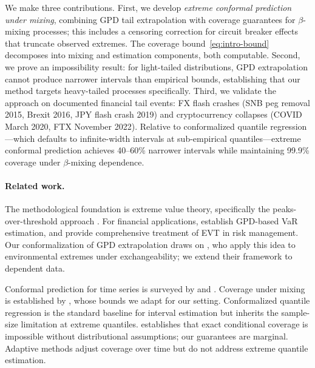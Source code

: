 We make three contributions. First, we develop \emph{extreme conformal prediction under mixing}, combining GPD tail extrapolation with coverage guarantees for $\beta$-mixing processes; this includes a censoring correction for circuit breaker effects that truncate observed extremes. The coverage bound~\eqref{eq:intro-bound} decomposes into mixing and estimation components, both computable. Second, we prove an impossibility result: for light-tailed distributions, GPD extrapolation cannot produce narrower intervals than empirical bounds, establishing that our method targets heavy-tailed processes specifically. Third, we validate the approach on documented financial tail events: FX flash crashes (SNB peg removal 2015, Brexit 2016, JPY flash crash 2019) and cryptocurrency collapses (COVID March 2020, FTX November 2022). Relative to conformalized quantile regression \citep{romano2019conformalized}—which defaults to infinite-width intervals at sub-empirical quantiles—extreme conformal prediction achieves 40--60\% narrower intervals while maintaining 99.9\% coverage under $\beta$-mixing dependence.

\paragraph{Related work.}
The methodological foundation is extreme value theory, specifically the peaks-over-threshold approach \citep{pickands1975statistical,balkema1974residual}. For financial applications, \citet{mcneil2000estimation} establish GPD-based VaR estimation, and \citet{embrechts2013modelling} provide comprehensive treatment of EVT in risk management. Our conformalization of GPD extrapolation draws on \citet{pasche2025extreme}, who apply this idea to environmental extremes under exchangeability; we extend their framework to dependent data.

Conformal prediction for time series is surveyed by \citet{zaffran2022adaptive} and \citet{xu2023sequential}. Coverage under mixing is established by \citet{barber2025predictive}, whose bounds we adapt for our setting. Conformalized quantile regression \citep{romano2019conformalized} is the standard baseline for interval estimation but inherits the sample-size limitation at extreme quantiles. \citet{vovk2012conditional} establishes that exact conditional coverage is impossible without distributional assumptions; our guarantees are marginal. Adaptive methods \citep{gibbs2021adaptive} adjust coverage over time but do not address extreme quantile estimation.

